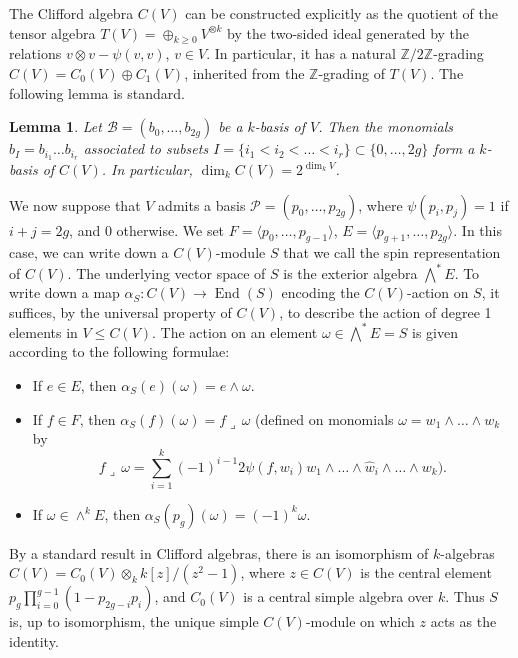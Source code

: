 \documentclass{article} %
\newtheorem{lemma}[proposition]{Lemma}
\numberwithin{equation}{section}
\DeclareMathOperator{\End}{End}
\newcommand{\Z}{\mathbb{Z}}
\begin{document}
The Clifford algebra $C(V)$ can be constructed explicitly as the quotient of the tensor algebra $T(V) = \oplus_{k \geq 0} V^{\otimes k}$ by the two-sided ideal generated by the relations $v \otimes v - \psi(v, v)$, $v \in V$. In particular, it has a natural $\Z / 2 \Z$-grading $C(V) = C_0(V) \oplus C_1(V)$, inherited from the $\Z$-grading of $T(V)$. The following lemma is standard.
\begin{lemma}
    Let $\mathcal{B} = (b_0, \dots, b_{2g})$ be a $k$-basis of $V$. Then the monomials $b_I = b_{i_1} \dots b_{i_r}$ associated to subsets $I = \{ i_1 < i_2 < \dots < i_r \} \subset \{0, \dots, 2g \}$ form a $k$-basis of $C(V)$. In particular, $\dim_k C(V) = 2^{\dim_k V}$.
\end{lemma}
We now suppose that $V$ admits a basis $\mathcal{P} = (p_0, \dots, p_{2g})$, where $\psi(p_i, p_j) = 1$ if $i + j = 2g$, and $0$ otherwise. We set $F = \langle p_0, \dots, p_{g-1} \rangle$, $E = \langle p_{g+1}, \dots, p_{2g}\rangle$. In this case, we can write down a $C(V)$-module $S$ that we call the spin representation of $C(V)$. 
The underlying vector space of $S$ is the exterior algebra $\bigwedge^\ast E$. To write down a map $\alpha_S\colon C(V)\rightarrow \End(S)$ encoding the $C(V)$-action on $S$, it suffices, by the universal property of $C(V)$, to describe the action of degree 1 elements in $V \leq C(V)$. The action on an element $\omega \in \bigwedge^\ast E = S$ is given according to the following formulae: 
\begin{itemize}
    \item If $e \in E$, then $\alpha_S(e)(\omega) = e \wedge \omega$.
    \item If $f \in F$, then $\alpha_S(f)(\omega) = f \lrcorner \, \omega$ (defined on monomials $\omega = w_1 \wedge \dots \wedge w_k$ by 
    \[ f \lrcorner \, \omega = \sum_{i=1}^k (-1)^{i-1} 2 \psi(f, w_i) w_1 \wedge \dots \wedge \hat{w}_i \wedge \dots \wedge w_k). \]
    \item If $\omega \in \wedge^k E$, then $\alpha_S(p_g)(\omega) = (-1)^k \omega$.
\end{itemize}
By a standard result in Clifford algebras, there is an isomorphism of $k$-algebras $C(V) = C_0(V) \otimes_k k[z] / (z^2 - 1)$, where $z \in C(V)$ is the central element $p_g \prod_{i=0}^{g-1} (1 - p_{2g-i} p_{i})$, and $C_0(V)$ is a central simple algebra over $k$. Thus $S$ is, up to isomorphism, the unique simple $C(V)$-module on which $z$ acts as the identity. 
\end{document}
